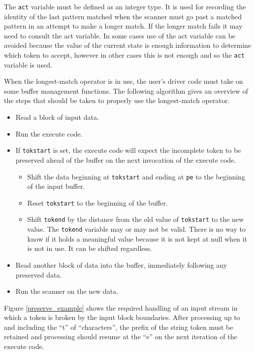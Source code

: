 \documentclass[letterpaper,11pt,oneside]{book}
\begin{document}
The \verb|act| variable must be defined as an integer type. It is used for
recording the identity of the last pattern matched when the scanner must go
past a matched pattern in an attempt to make a longer match. If the longer
match fails it may need to consult the act variable. In some cases use of the act
variable can be avoided because the value of the current state is enough
information to determine which token to accept, however in other cases this is
not enough and so the \verb|act| variable is used. 

When the longest-match operator is in use, the user's driver code must take on
some buffer management functions. The following algorithm gives an overview of
the steps that should be taken to properly use the longest-match operator.

\begin{itemize}
\setlength{\parskip}{0pt}
\item Read a block of input data.
\item Run the execute code.
\item If \verb|tokstart| is set, the execute code will expect the incomplete
token to be preserved ahead of the buffer on the next invocation of the execute
code.  
\begin{itemize}
\item Shift the data beginning at \verb|tokstart| and ending at \verb|pe| to the
beginning of the input buffer.
\item Reset \verb|tokstart| to the beginning of the buffer. 
\item Shift \verb|tokend| by the distance from the old value of \verb|tokstart|
to the new value. The \verb|tokend| variable may or may not be valid.  There is
no way to know if it holds a meaningful value because it is not kept at null
when it is not in use. It can be shifted regardless.
\end{itemize}
\item Read another block of data into the buffer, immediately following any
preserved data.
\item Run the scanner on the new data.
\end{itemize}

Figure \ref{preserve_example} shows the required handling of an input stream in
which a token is broken by the input block boundaries. After processing up to
and including the ``t'' of ``characters'', the prefix of the string token must be
retained and processing should resume at the ``e'' on the next iteration of
the execute code.
\end{document}
